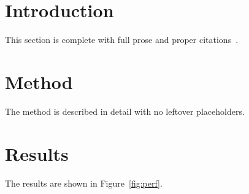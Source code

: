 \documentclass{article}
\begin{document}
\section{Introduction}
This section is complete with full prose and proper citations~\cite{smith2024}.

\section{Method}
The method is described in detail with no leftover placeholders.

\section{Results}
The results are shown in Figure~\ref{fig:perf}.
\end{document}
